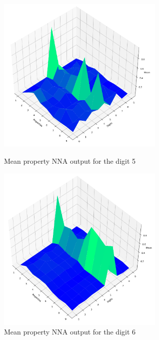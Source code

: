 \documentclass[conference]{IEEEtran}
\begin{document}
\begin{figure}[htbp]
\begin{minipage}{0.48\textwidth}
\centerline{\includegraphics[width=80mm]{./images/digit-5.png}}
\caption{Mean property NNA output for the digit 5}
\label{digit5votes}
\end{minipage}\hfill
\begin{minipage}{0.48\textwidth}
\centerline{\includegraphics[width=80mm]{./images/digit-6.png}}
\caption{Mean property NNA output for the digit 6}
\label{digit6votes}
\end{minipage}
\end{figure}
\end{document}
